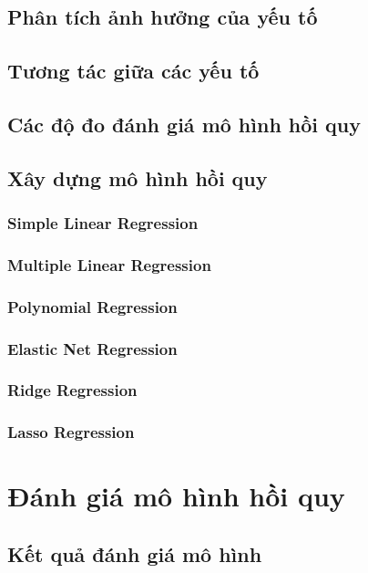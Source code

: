 \documentclass[runningheads]{llncs}
\begin{document}
\subsection{Phân tích ảnh hưởng của yếu tố}

\subsection{Tương tác giữa các yếu tố}

\subsection{Các độ đo đánh giá mô hình hồi quy}

\subsection{Xây dựng mô hình hồi quy}
\subsubsection{Simple Linear Regression}
\subsubsection{Multiple Linear Regression}
\subsubsection{Polynomial Regression}
\subsubsection{Elastic Net Regression}
\subsubsection{Ridge Regression}
\subsubsection{Lasso Regression}


\section{Đánh giá mô hình hồi quy}

\subsection{Kết quả đánh giá mô hình}
\end{document}
